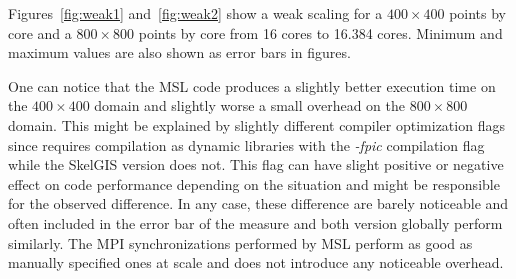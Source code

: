 Figures~\ref{fig:weak1} and~\ref{fig:weak2} show a weak scaling for a $400 \times 400$ points by core and a $800 \times 800$ points by core from 16 cores to 16.384 cores.
Minimum and maximum values are also shown as error bars in figures.

One can notice that the MSL code produces a slightly better execution time on the $400 \times 400$ domain and slightly worse a small overhead on the $800 \times 800$ domain.
This might be explained by slightly different compiler optimization flags since \llc requires compilation as dynamic libraries with the \emph{-fpic} compilation flag while the SkelGIS version does not.
This flag can have slight positive or negative effect on code performance depending on the situation and might be responsible for the observed difference.
In any case, these difference are barely noticeable and often included in the error bar of the measure and both version globally perform similarly.
The MPI synchronizations performed by MSL perform as good as manually specified ones at scale and \llc does not introduce any noticeable overhead.

